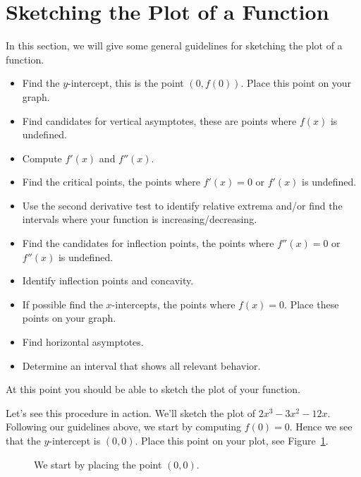 \section{Sketching the Plot of a Function} 


In this section, we will give some general guidelines for sketching
the plot of a function.

\begin{proposition}\hfil
\begin{itemize}
\item Find the $y$-intercept, this is the point $(0,f(0))$. Place this
  point on your graph.
\item Find candidates for vertical asymptotes, these are points where
  $f(x)$ is undefined.
\item Compute $f'(x)$ and $f''(x)$.
\item Find the critical points, the points where $f'(x) = 0$ or
  $f'(x)$ is undefined.
\item Use the second derivative test to identify relative extrema and/or
  find the intervals where your function is increasing/decreasing.
  \clearpage
\item Find the candidates for inflection points, the points where
  $f''(x) = 0$ or $f''(x)$ is undefined.
\item Identify inflection points and concavity.
\item If possible find the $x$-intercepts, the points where $f(x) =
  0$. Place these points on your graph.
\item Find horizontal asymptotes.
\item Determine an interval that shows all relevant behavior.
\end{itemize}
\cite{mooc}
At this point you should be able to sketch the plot of your function.
\end{proposition}

Let's see this procedure in action. We'll sketch the plot of
$2x^3-3x^2-12x$.  Following our guidelines above, we start by
computing $f(0) = 0$.  Hence we see that the $y$-intercept is
$(0,0)$. Place this point on your plot, see Figure~\ref{figure:CS1}. \cite{mooc}
\begin{figure}[H]
    \centering
{}
\caption{We start by placing the point $(0,0)$. \cite{mooc}}
\label{figure:CS1}
\end{figure}

